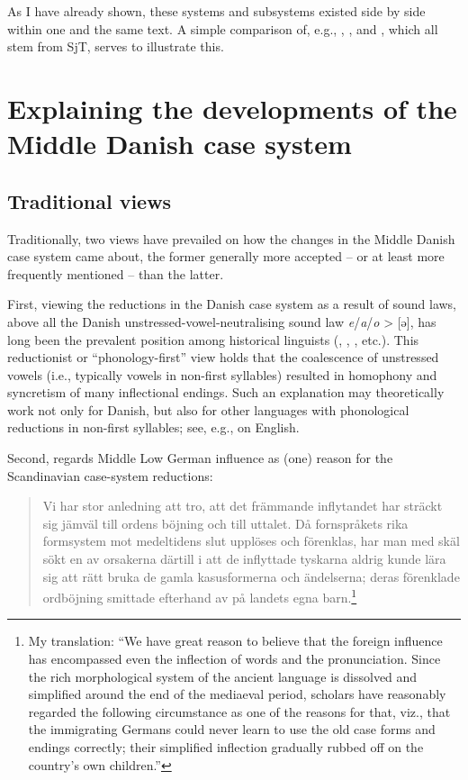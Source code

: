 \documentclass[output=paper]{langsci/langscibook}
\begin{document}
As I have already shown, these systems and subsystems existed side by side within one and the same text. A simple comparison of, e.g., , ,  and , which all stem from SjT, serves to illustrate this.

\section{Explaining the developments of the Middle Danish case system} \label{hansen:3}
\subsection{Traditional views} \label{hansen:3.1}\largerpage

Traditionally, two views have prevailed on how the changes in the Middle Danish case system came about, the former generally more accepted – or at least more frequently mentioned – than the latter. 

First, viewing the reductions in the Danish case system as a result of sound laws, above all the Danish unstressed-vowel-neutralising sound law \textit{e}/\textit{a}/\textit{o} > [ə], has long been the prevalent position among historical linguists (\citealt[XIV–XV, 16–17]{FalkFalk1900}, \citealt[71, 95–100, 113]{Meillet1922}, \citealt[266]{Skautrup1944}, etc.). This reductionist or “phonology-first” view holds that the coalescence of unstressed vowels (i.e., typically vowels in non-first syllables) resulted in homophony and syncretism of many inflectional endings. Such an explanation may theoretically work not only for Danish, but also for other languages with phonological reductions in non-first syllables; see, e.g., \citet[167--168]{BarberBarber2009} on English.

Second, \citet[27]{Wessén1954} regards Middle Low German influence as (one) reason for the Scandinavian case-system reductions:

\begin{quote}
Vi har stor anledning att tro, att det främmande inflytandet har sträckt sig jämväl till ordens böjning och till uttalet. Då fornspråkets rika formsystem mot medeltidens slut upplöses och förenklas, har man med skäl sökt en av orsakerna därtill i att de inflyttade tyskarna aldrig kunde lära sig att rätt bruka de gamla kasusformerna och ändelserna; deras förenklade ordböjning smittade efterhand av på landets egna barn.\footnote{My translation: ``We have great reason to believe that the foreign influence has encompassed even the inflection of words and the pronunciation. Since the rich morphological system of the ancient language is dissolved and simplified around the end of the mediaeval period, scholars have reasonably regarded the following circumstance as one of the reasons for that, viz., that the immigrating Germans could never learn to use the old case forms and endings correctly; their simplified inflection gradually rubbed off on the country’s own children.”}
\end{quote}
\end{document}
